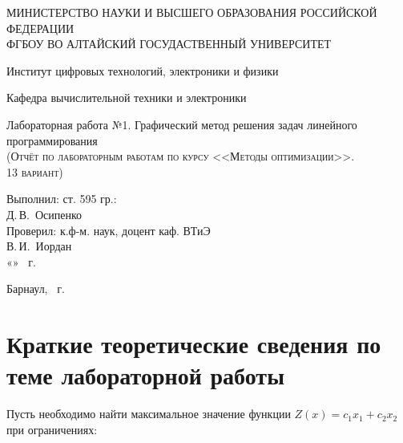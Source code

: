 \documentclass[a4paper, 12pt]{article}
\begin{document}
\begin{titlepage}
  \begin{center}
    \MakeUppercase{Министерство науки и высшего образования Российской Федерации} \\
    \MakeUppercase{ФГБОУ ВО Алтайский госудаственный университет}
    \vspace{0.25cm}
    
	  Институт цифровых технологий, электроники и физики
    
    Кафедра вычислительной техники и электроники
    \vfill
    
    {\LARGE Лабораторная работа №1. Графический метод решения задач линейного программирования}\\[5mm]
    \textsc{(Отчёт по лабораторным работам по курсу <<Методы оптимизации>>. \\13 вариант)}
  \bigskip

\end{center}
\vfill

\newlength{\ML}
\hfill
\begin{minipage}{0.45\textwidth}
  Выполнил: ст. 595 гр.:\\
  \underline{\hspace{\ML}} Д.\,В.~Осипенко\\
  Проверил: к.ф-м. наук, доцент каф. ВТиЭ\\
  \underline{\hspace{\ML}} В.\,И.~Иордан\\
  «\underline{\hspace{0.7cm}}» \underline{\hspace{2cm}} \the\year~г.
\end{minipage}%
\vfill

\begin{center}
  Барнаул, \the\year~г.
\end{center}
\end{titlepage}

\newpage

\section{Краткие теоретические сведения по теме лабораторной работы}
Пусть необходимо найти максимальное значение функции $Z(x) =c_1x_1 + c_2x_2 $ при ограничениях:\\
\end{document}
